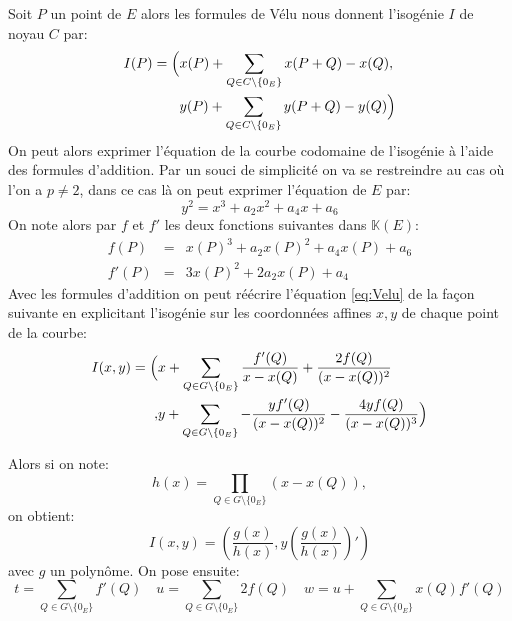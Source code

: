 \documentclass[10pt,a4paper]{book}
\theoremstyle{plain}
\theoremstyle{definition}
\theoremstyle{definition}
\theoremstyle{definition}
\theoremstyle{definition}
\theoremstyle{definition}
\theoremstyle{remark}
\theoremstyle{remark}
\theoremstyle{definition}
\begin{document}
Soit $P$ un point de $E$ alors les formules de Vélu nous donnent l'isogénie $I$ de noyau $C$ par: 
\begin{equation}
\label{eq:Velu}
\begin{alignedat}{1}
I(P)= \Bigl( &  x(P)+\sum_{Q \in C \setminus \{0_E\}} x(P+Q)-x(Q), \\
& y(P)+\sum_{Q \in C \setminus \{0_E\}} y(P+Q)-y(Q) \Bigr)
\end{alignedat}
\end{equation} 
On peut alors exprimer l'équation de la courbe codomaine de l'isogénie à l'aide des formules d'addition. Par un souci de simplicité on va se restreindre au cas où l'on a $p \neq 2$, dans ce cas là on peut exprimer l'équation de $E$ par:
\begin{equation*}
y^2=x^3+a_2 x^2 + a_4 x + a_6
\end{equation*}
On note alors par $f$ et $f'$ les deux fonctions suivantes dans $\mathbb{K}(E)$:
\begin{align*}
f(P)&=& x(P)^3+a_2x(P)^2+a_4x(P)+a_6 \\
f'(P)&=& 3x(P)^2+2a_2x(P)+a_4
\end{align*}
Avec les formules d'addition on peut réécrire l'équation \eqref{eq:Velu} de la façon suivante en explicitant l'isogénie sur les coordonnées affines $x,y$ de chaque point de la courbe:
\begin{equation} 
\begin{alignedat}{1}
I(x,y)= \Bigl( &  x + \sum_{Q \in G \setminus \{0_E\}} \frac{f'(Q)}{x-x(Q)}+\frac{2f(Q)}{(x-x(Q))^2} \\
 , &  y + \sum_{Q \in G \setminus \{0_E\}} -\frac{yf'(Q)}{(x-x(Q))^2}-\frac{4yf(Q)}{(x-x(Q))^3} \Bigr) 
\end{alignedat}
\label{eq:velu:sum}
\end{equation}

Alors si on note: 
\begin{equation*}
h(x)=\prod_{Q \in G \setminus \{0_E\}}(x-x(Q)),
\end{equation*}
on obtient:
\begin{equation} 
\label{eq:velu:gh}
I(x,y)=\left(\frac{g(x)}{h(x)},y\left( \frac{g(x)}{h(x)} \right)'\right)
\end{equation}
avec $g$ un polynôme. On pose ensuite:
\begin{equation*}
t= \sum_{Q \in G \setminus \{0_E\}} f'(Q) \quad u=\sum_{Q \in G \setminus \{0_E\}} 2f(Q) \quad w=u+\sum_{Q \in G \setminus \{0_E\}}x(Q)f'(Q) 
\end{equation*}
\end{document}
